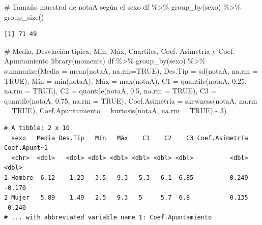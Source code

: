 \documentclass[
  a4paper,
]{scrreport}
\newenvironment{Shaded}{\begin{snugshade}}{\end{snugshade}}
\newcommand{\AttributeTok}[1]{\textcolor[rgb]{0.40,0.45,0.13}{#1}}
\newcommand{\CommentTok}[1]{\textcolor[rgb]{0.37,0.37,0.37}{#1}}
\newcommand{\ConstantTok}[1]{\textcolor[rgb]{0.56,0.35,0.01}{#1}}
\newcommand{\DecValTok}[1]{\textcolor[rgb]{0.68,0.00,0.00}{#1}}
\newcommand{\FloatTok}[1]{\textcolor[rgb]{0.68,0.00,0.00}{#1}}
\newcommand{\FunctionTok}[1]{\textcolor[rgb]{0.28,0.35,0.67}{#1}}
\newcommand{\NormalTok}[1]{\textcolor[rgb]{0.00,0.23,0.31}{#1}}
\newcommand{\OtherTok}[1]{\textcolor[rgb]{0.00,0.23,0.31}{#1}}
\newcommand{\SpecialCharTok}[1]{\textcolor[rgb]{0.37,0.37,0.37}{#1}}
\theoremstyle{definition}
\theoremstyle{definition}
\theoremstyle{remark}
\begin{document}
\begin{Shaded}
\begin{Highlighting}[]
\CommentTok{\# Tamaño muestral de notaA según el sexo}
\NormalTok{df }\SpecialCharTok{\%\textgreater{}\%} \FunctionTok{group\_by}\NormalTok{(sexo) }\SpecialCharTok{\%\textgreater{}\%} \FunctionTok{group\_size}\NormalTok{()}
\end{Highlighting}
\end{Shaded}

\begin{verbatim}
[1] 71 49
\end{verbatim}

\begin{Shaded}
\begin{Highlighting}[]
\CommentTok{\# Media, Desviación típica, Mín, Máx, Cuartiles, Coef. Asimetría y Coef. Apuntamiento}
\FunctionTok{library}\NormalTok{(moments)}
\NormalTok{df }\SpecialCharTok{\%\textgreater{}\%} \FunctionTok{group\_by}\NormalTok{(sexo) }\SpecialCharTok{\%\textgreater{}\%} \FunctionTok{summarize}\NormalTok{(}\AttributeTok{Media =} \FunctionTok{mean}\NormalTok{(notaA, }\AttributeTok{na.rm=}\ConstantTok{TRUE}\NormalTok{), }\AttributeTok{Des.Tip =} \FunctionTok{sd}\NormalTok{(notaA, }\AttributeTok{na.rm =} \ConstantTok{TRUE}\NormalTok{), Mín }\OtherTok{=} \FunctionTok{min}\NormalTok{(notaA), Máx }\OtherTok{=} \FunctionTok{max}\NormalTok{(notaA), }\AttributeTok{C1 =} \FunctionTok{quantile}\NormalTok{(notaA, }\FloatTok{0.25}\NormalTok{, }\AttributeTok{na.rm =} \ConstantTok{TRUE}\NormalTok{), }\AttributeTok{C2 =} \FunctionTok{quantile}\NormalTok{(notaA, }\FloatTok{0.5}\NormalTok{, }\AttributeTok{na.rm =} \ConstantTok{TRUE}\NormalTok{), }\AttributeTok{C3 =} \FunctionTok{quantile}\NormalTok{(notaA, }\FloatTok{0.75}\NormalTok{, }\AttributeTok{na.rm =} \ConstantTok{TRUE}\NormalTok{), Coef.Asimetría }\OtherTok{=} \FunctionTok{skewness}\NormalTok{(notaA, }\AttributeTok{na.rm =} \ConstantTok{TRUE}\NormalTok{), }\AttributeTok{Coef.Apuntamiento =} \FunctionTok{kurtosis}\NormalTok{(notaA, }\AttributeTok{na.rm =} \ConstantTok{TRUE}\NormalTok{) }\SpecialCharTok{{-}} \DecValTok{3}\NormalTok{)}
\end{Highlighting}
\end{Shaded}

\begin{verbatim}
# A tibble: 2 x 10
  sexo   Media Des.Tip   Mín   Máx    C1    C2    C3 Coef.Asimetría Coef.Apunt~1
  <chr>  <dbl>   <dbl> <dbl> <dbl> <dbl> <dbl> <dbl>          <dbl>        <dbl>
1 Hombre  6.12    1.23   3.5   9.3   5.3   6.1  6.85          0.249       -0.170
2 Mujer   5.89    1.49   2.5   9.3   5     5.7  6.8           0.135       -0.240
# ... with abbreviated variable name 1: Coef.Apuntamiento
\end{verbatim}
\end{document}

